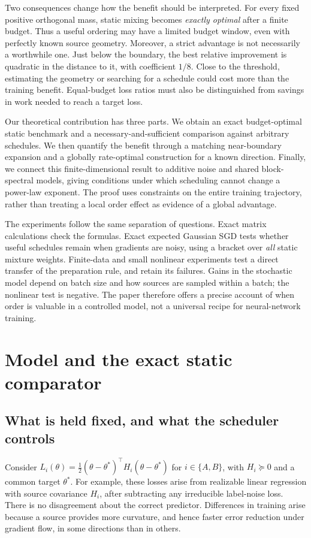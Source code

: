 \documentclass{article}
\theoremstyle{remark}\newtheorem{remark}[theorem]{Remark}
\begin{document}
Two consequences change how the benefit should be interpreted. For every fixed positive orthogonal mass, static mixing becomes \emph{exactly optimal} after a finite budget. Thus a useful ordering may have a limited budget window, even with perfectly known source geometry. Moreover, a strict advantage is not necessarily a worthwhile one. Just below the boundary, the best relative improvement is quadratic in the distance to it, with coefficient $1/8$. Close to the threshold, estimating the geometry or searching for a schedule could cost more than the training benefit. Equal-budget loss ratios must also be distinguished from savings in work needed to reach a target loss.

Our theoretical contribution has three parts. We obtain an exact budget-optimal static benchmark and a necessary-and-sufficient comparison against arbitrary schedules. We then quantify the benefit through a matching near-boundary expansion and a globally rate-optimal construction for a known direction. Finally, we connect this finite-dimensional result to additive noise and shared block-spectral models, giving conditions under which scheduling cannot change a power-law exponent. The proof uses constraints on the entire training trajectory, rather than treating a local order effect as evidence of a global advantage.

The experiments follow the same separation of questions. Exact matrix calculations check the formulas. Exact expected Gaussian SGD tests whether useful schedules remain when gradients are noisy, using a bracket over \emph{all} static mixture weights. Finite-data and small nonlinear experiments test a direct transfer of the preparation rule, and retain its failures. Gains in the stochastic model depend on batch size and how sources are sampled within a batch; the nonlinear test is negative. The paper therefore offers a precise account of when order is valuable in a controlled model, not a universal recipe for neural-network training.



\section{Model and the exact static comparator}\label{sec:model}
\subsection{What is held fixed, and what the scheduler controls}
Consider $L_i(\theta)=\tfrac12(\theta-\theta^*)^\top H_i(\theta-\theta^*)$ for $i\in\{A,B\}$, with $H_i\succeq0$ and a common target $\theta^*$. For example, these losses arise from realizable linear regression with source covariance $H_i$, after subtracting any irreducible label-noise loss. There is no disagreement about the correct predictor. Differences in training arise because a source provides more curvature, and hence faster error reduction under gradient flow, in some directions than in others.
\end{document}
